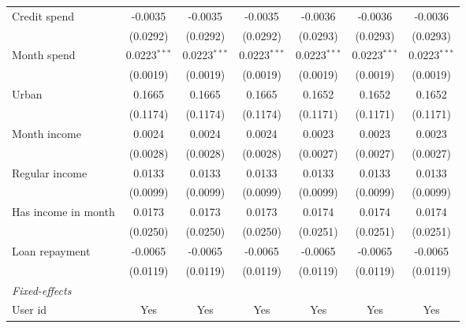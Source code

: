 \begin{table}[htbp]
\begin{threeparttable}[b]
\begin{tabular}{lcccccc}
         Credit spend        & -0.0035        & -0.0035        & -0.0035        & -0.0036        & -0.0036        & -0.0036\\   
                             & (0.0292)       & (0.0292)       & (0.0292)       & (0.0293)       & (0.0293)       & (0.0293)\\   
         Month spend         & 0.0223$^{***}$ & 0.0223$^{***}$ & 0.0223$^{***}$ & 0.0223$^{***}$ & 0.0223$^{***}$ & 0.0223$^{***}$\\   
                             & (0.0019)       & (0.0019)       & (0.0019)       & (0.0019)       & (0.0019)       & (0.0019)\\   
         Urban               & 0.1665         & 0.1665         & 0.1665         & 0.1652         & 0.1652         & 0.1652\\   
                             & (0.1174)       & (0.1174)       & (0.1174)       & (0.1171)       & (0.1171)       & (0.1171)\\   
         Month income        & 0.0024         & 0.0024         & 0.0024         & 0.0023         & 0.0023         & 0.0023\\   
                             & (0.0028)       & (0.0028)       & (0.0028)       & (0.0027)       & (0.0027)       & (0.0027)\\   
         Regular income      & 0.0133         & 0.0133         & 0.0133         & 0.0133         & 0.0133         & 0.0133\\   
                             & (0.0099)       & (0.0099)       & (0.0099)       & (0.0099)       & (0.0099)       & (0.0099)\\   
         Has income in month & 0.0173         & 0.0173         & 0.0173         & 0.0174         & 0.0174         & 0.0174\\   
                             & (0.0250)       & (0.0250)       & (0.0250)       & (0.0251)       & (0.0251)       & (0.0251)\\   
         Loan repayment      & -0.0065        & -0.0065        & -0.0065        & -0.0065        & -0.0065        & -0.0065\\   
                             & (0.0119)       & (0.0119)       & (0.0119)       & (0.0119)       & (0.0119)       & (0.0119)\\   
         \midrule
         \emph{Fixed-effects}\\
         User id             & Yes            & Yes            & Yes            & Yes            & Yes            & Yes\\  

\end{tabular}
\end{threeparttable}
\end{table}
